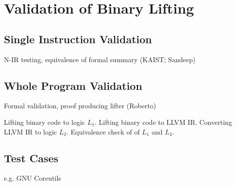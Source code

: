 

\section{Validation of Binary Lifting}
\label{sec:validation_of_binary_lifting}


\subsection{Single Instruction Validation}

N-IR testing, equivalence of formal summary (KAIST; Sandeep)


\subsection{Whole Program Validation}

Formal validation, proof producing lifter (Roberto)

Lifting binary code to logic $L_1$.
Lifting binary code to LLVM IR.
Converting LLVM IR to logic $L_2$.
Equivalence check of of $L_1$ and $L_2$.



\subsection{Test Cases}

e.g. GNU Coreutils
